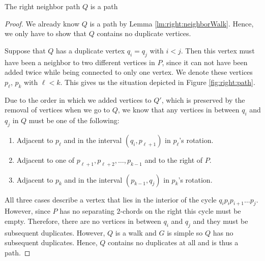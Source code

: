     \begin{lemma}
      \label{lm:right:neighborPath}
      The right neighbor path $Q$ is a path
    \end{lemma}
    \begin{proof}
      We already know $Q$ is a path by Lemma \ref{lm:right:neighborWalk}. Hence, we only have to show that $Q$ contains no duplicate vertices.

      Suppose that $Q$ has a duplicate vertex $q_i=q_j$ with $i<j$.
      Then this vertex must have been a neighbor to two different vertices in $P$, since it can not have been added twice while being connected to only one vertex.
      We denote these vertices $p_\ell$, $p_k$ with $\ell<k$.
      This gives us the situation depicted in Figure \ref{fig:right:path}.

      Due to the order in which we added vertices to $Q'$, which is preserved by the removal of vertices when we go to $Q$, we know that any vertices in between $q_i$ and $q_j$ in $Q$ must be one of the following:
      \begin{enumerate}
        \item Adjacent to $p_\ell$ and in the interval $(q_i, p_{\ell+1})$ in $p_\ell$'s rotation.
        \item Adjacent to one of $p_{\ell+1},  p_{\ell+2},\ldots, p_{k-1}$ and to the right of $P$.
        \item Adjacent to $p_k$ and in the interval $(p_{k-1}, q_j)$ in $p_k$'s rotation.
      \end{enumerate}

      All three cases describe a vertex that lies in the interior of the cycle $q_i p_i p_{i+1} \ldots p_j$. However, since $P$ has no separating $2$-chords on the right this cycle must be empty. Therefore, there are no vertices in between $q_i$ and $q_j$ and they must be subsequent duplicates. However, $Q$ is a walk and $G$ is simple so $Q$ has no subsequent duplicates. Hence, $Q$ contains no duplicates at all and is thus a path.
    \end{proof}

